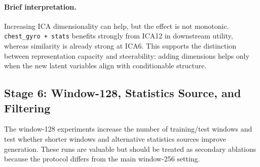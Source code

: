 \paragraph{Brief interpretation.}
Increasing ICA dimensionality can help, but the effect is not monotonic.
\texttt{chest\_gyro + stats} benefits strongly from ICA12 in downstream utility,
whereas similarity is already strong at ICA6. This supports the distinction
between representation capacity and steerability: adding dimensions helps only
when the new latent variables align with conditionable structure.

\subsection*{Stage 6: Window-128, Statistics Source, and Filtering}

The window-128 experiments increase the number of training/test windows and test
whether shorter windows and alternative statistics sources improve generation.
These runs are valuable but should be treated as secondary ablations because the
protocol differs from the main window-256 setting.

\begin{table}[t]
\centering
\small
\caption{Window-128 statistics-prompt experiments. These results are useful as a
secondary ablation because the window length and number of prompts differ from
the main setting. ED/ref and DTW/ref are retained as compact distance summaries;
the full SDForger-style similarity metrics, including SD (skew.) and SHR, should
be reported in the accompanying full-metric CSV or appendix table.}
\label{tab:shanjun-win128}
\end{table}

